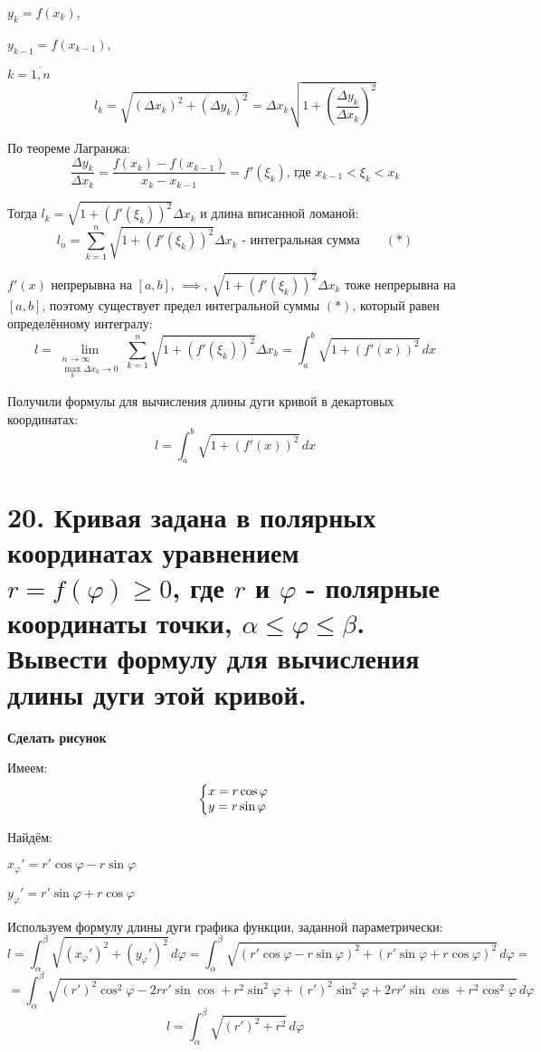 \documentclass[11pt]{article}
\begin{document}
\par $y_{k} = f(x_{k})$,
\par $y_{k-1} = f(x_{k-1})$,
\par $k = \overline{1, n}$
$$l_{k} = \sqrt{ (\Delta x_{k})^2 + (\Delta y_{k})^2} = \Delta x_{k} \sqrt{ 1 + \left(\frac{\Delta y_{k}}{\Delta x_{k}}\right)^2 }$$
\par По теореме Лагранжа:$$\frac{\Delta y_{k}}{\Delta x_{k}} = \frac{f(x_{k}) - f(x_{k-1})}{x_{k} - x_{k-1}} = f'(\xi_{k}) \text{, где } x_{k-1} < \xi_{k} < x_{k}$$
\par Тогда $l_{k} = \sqrt{ 1 + (f'(\xi_{k}))^2 } \Delta x_{k}$ и длина вписанной ломаной: $$l_{n} = \sum_{k=1}^n \sqrt{ 1 + (f'(\xi_{k}))^2 } \Delta x_{k} \text{ - интегральная сумма}\qquad (*)$$
\par $f'(x)$ непрерывна на $[a, b]$, $\implies$, $\sqrt{ 1 + (f'(\xi_{k}))^2 } \Delta x_{k}$ тоже непрерывна на $[a, b]$, поэтому существует предел интегральной суммы $(*)$, который равен определённому интегралу:$$l = \lim_{\substack{n \to \infty \\ \max_{k} \Delta x_{k} \to 0}} \sum_{k=1}^n \sqrt{ 1 + (f'(\xi_{k}))^2 } \Delta x_{k} = \int_{a}^b \sqrt{ 1 + (f'(x))^2 } \, dx$$
\par Получили формулы для вычисления длины дуги кривой в декартовых координатах:$$l = \int_{a}^b \sqrt{ 1 + (f'(x))^2 } \, dx$$

\section*{20. Кривая задана в полярных координатах уравнением $r = f(\varphi) \geq 0$, где $r$ и $\varphi$ - полярные координаты точки, $\alpha \leq \varphi \leq \beta$. Вывести формулу для вычисления длины дуги этой кривой.}
\par\textbf{Сделать рисунок}
\par Имеем: $$\left\{\begin{array}{@{}l@{}} x = r \cos \varphi \\ y = r \sin \varphi \end{array}\right.\,$$
\par Найдём:
\par $x_{\varphi}' = r' \cos \varphi - r \sin \varphi$
\par $y_{\varphi}' = r' \sin \varphi + r \cos \varphi$
\par Используем формулу длины дуги графика функции, заданной параметрически:$$l = \int_{\alpha}^{\beta} \sqrt{ (x_{\varphi}')^2 + (y_{\varphi}')^2 } \, d\varphi = \int_{\alpha}^{\beta} \sqrt{ (r' \cos \varphi - r \sin \varphi)^2 + (r' \sin \varphi + r \cos \varphi)^2 }\, d\varphi =$$
$$= \int_{\alpha}^{\beta} \sqrt{ (r')^2 \cos^2 \varphi - 2 r r' \sin \cos + r^2\sin^2 \varphi + (r')^2 \sin^2 \varphi + 2 r r' \sin \cos + r^2 \cos^2 \varphi } \, d\varphi$$
$$l = \int_{\alpha}^{\beta} \sqrt{ (r')^2 + r^2 }\, d\varphi$$
\end{document}
